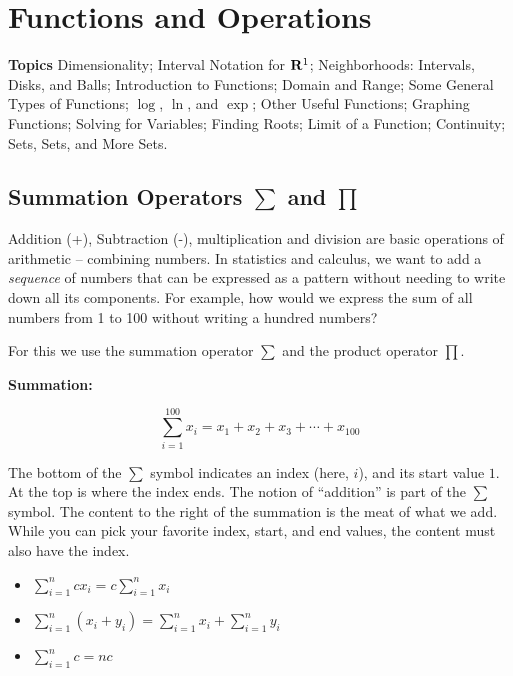 \documentclass[]{book}
\providecommand{\tightlist}{%
  \setlength{\itemsep}{0pt}\setlength{\parskip}{0pt}}
\theoremstyle{definition}
\theoremstyle{definition}
\theoremstyle{definition}
\theoremstyle{remark}
\begin{document}
\hypertarget{functions-and-operations}{%
\chapter{Functions and Operations}\label{functions-and-operations}}

\textbf{Topics}
Dimensionality;
Interval Notation for \({\bf R}^1\);
Neighborhoods: Intervals, Disks, and Balls; Introduction to Functions;
Domain and Range;
Some General Types of Functions;
\(\log\), \(\ln\), and \(\exp\);
Other Useful Functions;
Graphing Functions;
Solving for Variables;
Finding Roots;
Limit of a Function;
Continuity; Sets, Sets, and More Sets.

\hypertarget{sum-notation}{%
\section{\texorpdfstring{Summation Operators \(\sum\) and \(\prod\)}{Summation Operators \textbackslash{}sum and \textbackslash{}prod}}\label{sum-notation}}

Addition (+), Subtraction (-), multiplication and division are basic operations of arithmetic -- combining numbers. In statistics and calculus, we want to add a \emph{sequence} of numbers that can be expressed as a pattern without needing to write down all its components. For example, how would we express the sum of all numbers from 1 to 100 without writing a hundred numbers?

For this we use the summation operator \(\sum\) and the product operator \(\prod\).

\textbf{Summation:}

\[\sum\limits_{i=1}^{100} x_i = x_1+x_2+x_3+\cdots+x_{100}\]

The bottom of the \(\sum\) symbol indicates an index (here, \(i\)), and its start value \(1\). At the top is where the index ends. The notion of ``addition'' is part of the \(\sum\) symbol. The content to the right of the summation is the meat of what we add. While you can pick your favorite index, start, and end values, the content must also have the index.

\begin{itemize}
\tightlist
\item
  \(\sum\limits_{i=1}^n c x_i = c \sum\limits_{i=1}^n x_i\)
\item
  \(\sum\limits_{i=1}^n (x_i + y_i) = \sum\limits_{i=1}^n x_i + \sum\limits_{i=1}^n y_i\)
\item
  \(\sum\limits_{i=1}^n c = n c\)
\end{itemize}
\end{document}
